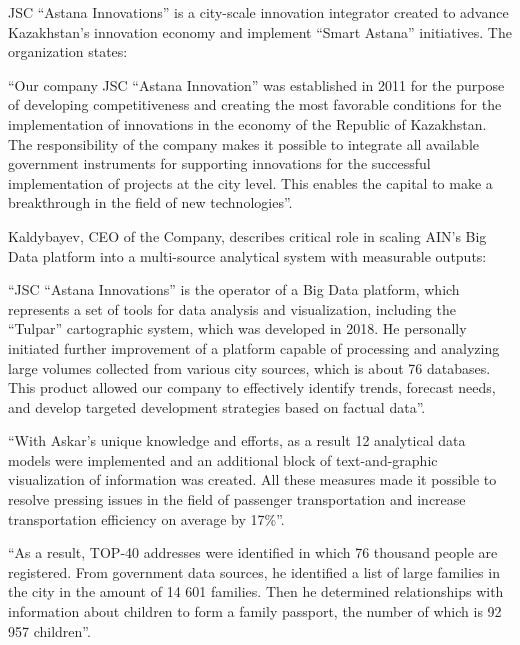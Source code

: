 JSC “Astana Innovations” is a city-scale innovation integrator created to advance Kazakhstan’s innovation economy and implement “Smart Astana” initiatives. The organization states:
\begin{fullquote}
``Our company JSC ``Astana Innovation'' was established in 2011 for the purpose of developing competitiveness and creating the most favorable conditions for the implementation of innovations in the economy of the Republic of Kazakhstan. The responsibility of the company makes it possible to integrate all available government instruments for supporting innovations for the successful implementation of projects at the city level. This enables the capital to make a breakthrough in the field of new technologies''.
\end{fullquote}

Kaldybayev, CEO of the Company, describes \mrls critical role in scaling AIN’s Big Data platform into a multi-source analytical system with measurable outputs:
\begin{fullquote}
``JSC “Astana Innovations” is the operator of a Big Data platform, which represents a set of tools for data analysis and visualization, including the “Tulpar” cartographic system, which was developed in 2018. He personally initiated further improvement of a platform capable of processing and analyzing large volumes collected from various city sources, which is about 76 databases. This product allowed our company to effectively identify trends, forecast needs, and develop targeted development strategies based on factual data''.
\end{fullquote}

\begin{fullquote}
``With Askar’s unique knowledge and efforts, as a result 12 analytical data models were implemented and an additional block of text-and-graphic visualization of information was created. All these measures made it possible to resolve pressing issues in the field of passenger transportation and increase transportation efficiency on average by 17\%''.
\end{fullquote}

\begin{fullquote}
``As a result, TOP-40 addresses were identified in which 76 thousand people are registered. From government data sources, he identified a list of large families in the city in the amount of 14 601 families. Then he determined relationships with information about children to form a family passport, the number of which is     92 957 children''.
\end{fullquote}


